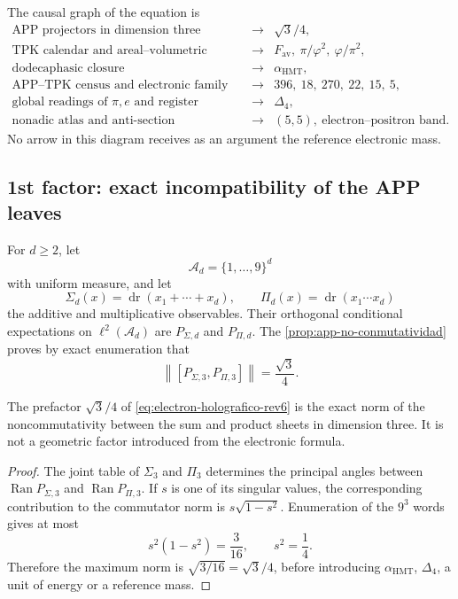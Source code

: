 The causal graph of the equation is
\[
\begin{array}{ccl}
\text{APP projectors in dimension three}
&\longrightarrow& \sqrt3/4,\\[2mm]
\text{TPK calendar and areal--volumetric sheets}
&\longrightarrow&
F_{\mathrm{av}},\ \pi/\varphi^2,\
\varphi/\pi^2,\\[2mm]
\text{dodecaphasic closure}
&\longrightarrow&\alpha_{\mathrm{HMT}},\\[2mm]
\text{APP--TPK census and electronic family}
&\longrightarrow&396,\ 18,\ 270,\ 22,\ 15,\ 5,\\[2mm]
\text{global readings of }\pi,e\text{ and register}
&\longrightarrow&\Delta_4,\\[2mm]
\text{nonadic atlas and anti-section}
&\longrightarrow&(5,5),\
\text{electron--positron band}.
\end{array}
\]
No arrow in this diagram receives as an argument the reference electronic mass.

\subsection{1st factor: exact incompatibility of the APP leaves}

For \(d\geq2\), let
\[
 \mathscr A_d=\{1,\ldots,9\}^d
\]
with uniform measure, and let
\[
 \Sigma_d(x)=\operatorname{dr}(x_1+\cdots+x_d),
 \qquad
 \Pi_d(x)=\operatorname{dr}(x_1\cdots x_d)
\]
the additive and multiplicative observables. Their orthogonal conditional expectations
on \(\ell^2(\mathscr A_d)\) are
\(P_{\Sigma,d}\) and \(P_{\Pi,d}\). The
\cref{prop:app-no-conmutatividad} proves by exact enumeration that
\[
 \left\|[P_{\Sigma,3},P_{\Pi,3}]\right\|
 =\frac{\sqrt3}{4}.
\]

\begin{proposition}
\label{prop:prefactor-app-electron-rev6}
The prefactor \(\sqrt3/4\) of
\cref{eq:electron-holografico-rev6} is the exact norm of the
noncommutativity between the sum and product sheets in dimension three.
It is not a geometric factor introduced from the electronic formula.
\end{proposition}

\begin{proof}
The joint table of \(\Sigma_3\) and \(\Pi_3\) determines the principal
angles between
\(\operatorname{Ran}P_{\Sigma,3}\) and
\(\operatorname{Ran}P_{\Pi,3}\). If \(s\) is one of its singular
values, the corresponding contribution to the commutator norm is
\(s\sqrt{1-s^2}\). Enumeration of the \(9^3\) words gives at most
\[
 s^2(1-s^2)=\frac3{16},
 \qquad s^2=\frac14.
\]
Therefore the maximum norm is \(\sqrt{3/16}=\sqrt3/4\), before
introducing \(\alpha_{\mathrm{HMT}}\), \(\Delta_4\), a unit of energy
or a reference mass.
\end{proof}

